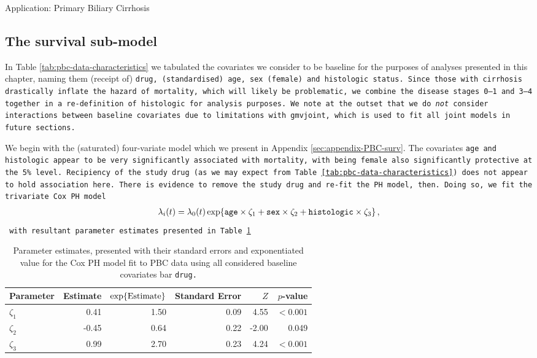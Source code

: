 \begin{chapter}{\label{cha:app-PBC}Application: Primary Biliary Cirrhosis}
  \subsection{The survival sub-model}\label{sec:pbc-modelbuilding-survival}
  In Table \ref{tab:pbc-data-characteristics} we tabulated the covariates we consider to be baseline for the purposes of analyses presented in this chapter, naming them (receipt of) \tt{drug}, (standardised) \tt{age}, \tt{sex} (female) and \tt{histologic} status. Since those with cirrhosis drastically inflate the hazard of mortality, which will likely be problematic, we combine the disease stages 0--1 and 3--4 together in a re-definition of \tt{histologic} for analysis purposes. We note at the outset that we do \textit{not} consider interactions between baseline covariates due to limitations with \tt{gmvjoint}, which is used to fit all joint models in future sections.

  We begin with the (saturated) four-variate model which we present in Appendix \ref{sec:appendix-PBC-surv}. The covariates \tt{age} and \tt{histologic} appear to be very significantly associated with mortality, with being female also significantly protective at the 5\% level. Recipiency of the study drug (as we may expect from Table \ref{tab:pbc-data-characteristics}) does not appear to hold association here. There is evidence to remove the study drug and re-fit the PH model, then. Doing so, we fit the trivariate Cox PH model
  \begin{align}
      \lambda_i\!\left( t\right)=\lambda_0\!\left( t\right)\exp\!\left\{\texttt{age}\times\zeta_1+\texttt{sex}\times\zeta_2+\texttt{histologic}\times\zeta_3\right\},
  \label{eq:pbc-surv-model}
  \end{align}
  with resultant parameter estimates presented in Table \ref{tab:pbc-surv-model}
  \begin{table}[ht]
  \centering
  \captionsetup{font=scriptsize}
  \begin{tabular}{l|rrrrr}
    Parameter & Estimate & $\exp\!\left\{\mathrm{Estimate}\right\}$ & Standard Error & $Z$ & $p$-value \\ 
    \hline
    $\zeta_1$ & 0.41 & 1.50 & 0.09 & 4.55 & $<0.001$ \\ 
    $\zeta_2$ & -0.45 & 0.64 & 0.22 & -2.00 & 0.049   \\ 
    $\zeta_3$ & 0.99 & 2.70 & 0.23 & 4.24 & $<0.001$ \\ 
    \hline
  \end{tabular}
  \caption{Parameter estimates, presented with their standard errors and exponentiated value for the Cox PH model fit to PBC data using all considered baseline covariates bar \tt{drug}.}
  \label{tab:pbc-surv-model}
  \end{table}
  

\end{chapter}
